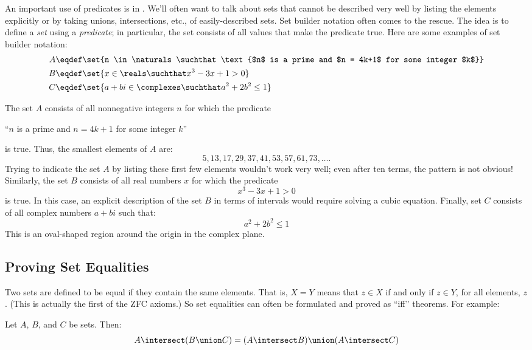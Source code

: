 An important use of predicates is in .  We'll
often want to talk about sets that cannot be described very well by
listing the elements explicitly or by taking unions, intersections,
etc., of easily-described sets.  Set builder notation often comes to the
rescue.  The idea is to define a \textit{set} using a \textit{predicate};
in particular, the set consists of all values that make the predicate
true.  Here are some examples of set builder notation:
\begin{align*}
A & \eqdef \set{n \in \naturals \suchthat \text{$n$ is a prime and $n =
    4k+1$ for some integer $k$}} \\
B & \eqdef \set{x \in \reals \suchthat x^3 - 3 x + 1 > 0} \\
C & \eqdef \set{a + b i \in \complexes \suchthat a^2 + 2 b^2 \leq 1}
\end{align*}

The set $A$ consists of all nonnegative integers $n$ for which the
predicate
\begin{center}
``$n$ is a prime and $n = 4k+1$ for some integer $k$''
\end{center}
is true.  Thus, the smallest elements of $A$ are:
\[
5, 13, 17, 29, 37, 41, 53, 57, 61, 73, \ldots.
\]
Trying to indicate the set $A$ by listing these first few elements
wouldn't work very well; even after ten terms, the pattern is not
obvious!  Similarly, the set $B$ consists of all real numbers $x$ for
which the predicate
\[
x^3 - 3x + 1 > 0
\]
is true.  In this case, an explicit description of the set $B$ in
terms of intervals would require solving a cubic equation.  Finally,
set $C$ consists of all complex numbers $a + b i$ such that:
\[
a^2 + 2 b^2 \leq 1
\]
This is an oval-shaped region around the origin in the complex plane.

\subsection{Proving Set Equalities}

Two sets are defined to be equal if they contain the same elements.  That
is, $X = Y$ means that $z \in X$ if and only if $z \in Y$, for all
elements, $z$.  (This is actually the first of the ZFC axioms.)  So set
equalities can often be formulated and proved as ``iff'' theorems.  For
example:
\begin{theorem}
Let $A$, $B$, and $C$ be sets.  Then:
\begin{equation}\label{set-distrib}
A \intersect (B \union C) = (A \intersect B) \union (A \intersect C)
\end{equation}
\end{theorem}

